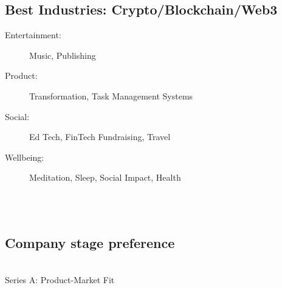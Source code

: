 {{\subsection*{%
Best Industries:
Crypto/Blockchain/Web3
}
\begin{description}
\item[Entertainment:] Music, Publishing %
\item[Product:]
Transformation,
Task Management Systems
\item[Social:]
Ed Tech,
FinTech
Fundraising,
Travel %
\item[Wellbeing:] Meditation, Sleep, Social Impact, Health %
\end{description}
\\ \\
\subsection*{Company stage preference}     \\
Series A:
Product-Market Fit






    }%
}
